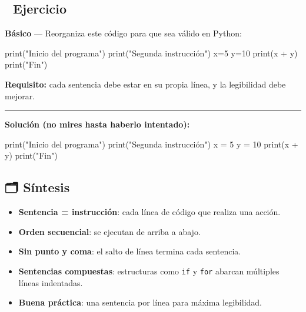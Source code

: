 \documentclass[
  doc,
  floatsintext,
  longtable,
  a4paper,
  nolmodern,
  notxfonts,
  notimes,
  12pt,
  colorlinks=true,linkcolor=blue,citecolor=blue,urlcolor=blue]{apa7}
\newenvironment{Shaded}{\begin{snugshade}}{\end{snugshade}}
\newcommand{\BuiltInTok}[1]{\textcolor[rgb]{0.00,0.23,0.31}{#1}}
\newcommand{\DecValTok}[1]{\textcolor[rgb]{0.68,0.00,0.00}{#1}}
\newcommand{\NormalTok}[1]{\textcolor[rgb]{0.00,0.23,0.31}{#1}}
\newcommand{\OperatorTok}[1]{\textcolor[rgb]{0.37,0.37,0.37}{#1}}
\newcommand{\StringTok}[1]{\textcolor[rgb]{0.13,0.47,0.30}{#1}}
\providecommand{\tightlist}{%
  \setlength{\itemsep}{0pt}\setlength{\parskip}{0pt}}
\begin{document}
\subsection{📝 Ejercicio}\label{ejercicio}

\textbf{Básico} --- Reorganiza este código para que sea válido en
Python:

\begin{Shaded}
\begin{Highlighting}[]
\BuiltInTok{print}\NormalTok{(}\StringTok{"Inicio del programa"}\NormalTok{) }\BuiltInTok{print}\NormalTok{(}\StringTok{"Segunda instrucción"}\NormalTok{) x}\OperatorTok{=}\DecValTok{5}\NormalTok{ y}\OperatorTok{=}\DecValTok{10} \BuiltInTok{print}\NormalTok{(x }\OperatorTok{+}\NormalTok{ y) }\BuiltInTok{print}\NormalTok{(}\StringTok{"Fin"}\NormalTok{)}
\end{Highlighting}
\end{Shaded}

\textbf{Requisito:} cada sentencia debe estar en su propia línea, y la
legibilidad debe mejorar.

\begin{center}\rule{0.5\linewidth}{0.5pt}\end{center}

\textbf{Solución (no mires hasta haberlo intentado):}

\begin{Shaded}
\begin{Highlighting}[]
\BuiltInTok{print}\NormalTok{(}\StringTok{"Inicio del programa"}\NormalTok{)}
\BuiltInTok{print}\NormalTok{(}\StringTok{"Segunda instrucción"}\NormalTok{)}
\NormalTok{x }\OperatorTok{=} \DecValTok{5}
\NormalTok{y }\OperatorTok{=} \DecValTok{10}
\BuiltInTok{print}\NormalTok{(x }\OperatorTok{+}\NormalTok{ y)}
\BuiltInTok{print}\NormalTok{(}\StringTok{"Fin"}\NormalTok{)}
\end{Highlighting}
\end{Shaded}

\subsection{🗂️ Síntesis}\label{suxedntesis}

\begin{itemize}
\tightlist
\item
  \textbf{Sentencia = instrucción}: cada línea de código que realiza una
  acción.
\item
  \textbf{Orden secuencial}: se ejecutan de arriba a abajo.
\item
  \textbf{Sin punto y coma}: el salto de línea termina cada sentencia.
\item
  \textbf{Sentencias compuestas}: estructuras como \texttt{if} y
  \texttt{for} abarcan múltiples líneas indentadas.
\item
  \textbf{Buena práctica}: una sentencia por línea para máxima
  legibilidad.
\end{itemize}
\end{document}
